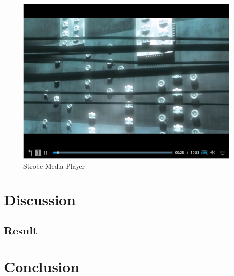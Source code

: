 \documentclass[9pt,a4paper]{acmproc}
\begin{document}
\begin{figure}[ht!]
\begin{center}
	\includegraphics[scale=0.5]{Media_player.png}
	\caption{Strobe Media Player}
\end{center}
\end{figure}

\clearpage

\section{Discussion}

\subsection{Result}

\section{Conclusion}
\end{document}
